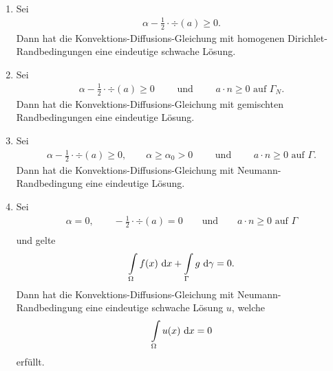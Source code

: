 \begin{theorem}\ 
\begin{enumerate}[label=(\roman*)]
\item Sei 
\begin{align*}
\alpha-\frac{1}{2}\cdot\div(a)\geq0.
\end{align*}
Dann hat die Konvektions-Diffusions-Gleichung mit homogenen Dirichlet-Randbedingungen eine eindeutige schwache Lösung.
\item Sei 
\begin{align*}
\alpha-\frac{1}{2}\cdot\div(a)\geq0\qquad\text{ und }\qquad a\cdot n\geq0\text{ auf }\Gamma_N.
\end{align*}
Dann hat die Konvektions-Diffusions-Gleichung mit gemischten Randbedingungen eine eindeutige Lösung.
\item Sei 
\begin{align*}
\alpha-\frac{1}{2}\cdot\div(a)\geq0,\qquad \alpha\geq\alpha_0>0\qquad\text{ und }\qquad a\cdot n\geq 0\text{ auf }\Gamma.
\end{align*}
Dann hat die Konvektions-Diffusions-Gleichung mit Neumann-Randbedingung eine eindeutige Lösung.
\item Sei
\begin{align*}
\alpha=0,\qquad-\frac{1}{2}\cdot\div(a)=0\qquad\text{und}\qquad a\cdot n\geq 0\text{ auf }\Gamma\\
\end{align*}
und gelte
\begin{align*}
	\int\limits_\Omega f(x)\text{ d} x+\int\limits_\Gamma g\text{ d}\gamma=0.
\end{align*}
Dann hat die Konvektions-Diffusions-Gleichung mit Neumann-Randbedingung eine eindeutige schwache Lösung $u$, welche 
\begin{align*}
\int\limits_\Omega u(x)\text{ d} x=0
\end{align*}
erfüllt.
\end{enumerate}
\end{theorem}

